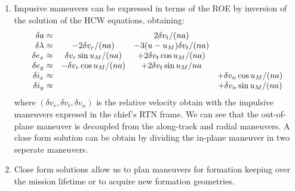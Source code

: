\documentclass[a4paper]{report}
\begin{document}
\begin{enumerate}[label=\emph{\alph*)}]
  \item %
    Impusive maneuvers can be expressed in terms of the ROE by inversion of the solution of the HCW equations, obtaining:
    \[ \begin{array}{r c c c}
      \delta a \approx & & 2 \delta v_t/(na) & \\    
      \delta \lambda \approx & -2\delta v_r/(na) & -3(u-u_M)\delta v_t/(na) & \\
      \delta e_x \approx & \delta v_r \sin{u_M}/(na) & +2\delta v_t\cos{u_M}/(na) & \\
      \delta e_y \approx & -\delta v_r \cos{u_M}/(na) & +2\delta v_t \sin{u_M}/{na} & \\
      \delta i_x \approx & & & +\delta v_n \cos{u_M}/(na) \\
      \delta i_y \approx & & & +\delta v_n \sin{u_M}/(na) 
  \end{array}\]
  where $(\delta v_r,\delta v_t,\delta v_n)$ is the relative velocity obtain with the impulsive maneuvers expresed in the chief's RTN frame. We can see that the out-of-plane maneuver is decoupled from the along-track and radial maneuvers. A close form solution can be obtain by dividing the in-plane maneuver in two seperate maneuvers.


  \item %
    Close form solutions allow us to plan maneuvers for formation keeping over the mission lifetime or to acquire new formation geometries.


\end{enumerate}
\end{document}
